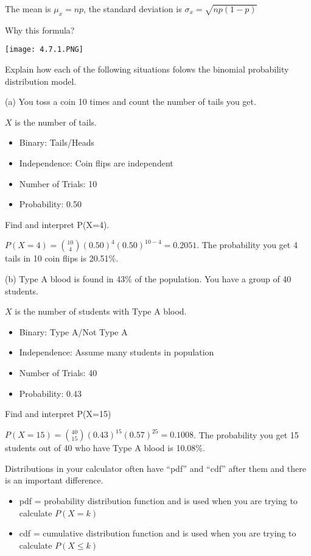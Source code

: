 \documentclass[../stats.tex]{subfiles}
\begin{document}
The mean is $\mu_x=np$, the standard deviation is $\sigma_x=\sqrt{np(1-p)}$

Why this formula?
\begin{center}
    \texttt{[image: 4.7.1.PNG]}
\end{center}

\begin{example}
    Explain how each of the following situations folows the binomial probability distribution model.

    (a) You toss a coin 10 times and count the number of tails you get.

    $X$ is the number of tails.
    \begin{itemize}
        \item Binary: Tails/Heads 
        \item Independence: Coin flips are independent
        \item Number of Trials: 10
        \item Probability: 0.50
    \end{itemize}

    Find and interpret P(X=4).

    $P(X=4)=\binom{10}{4}(0.50)^4(0.50)^{10-4}=0.2051$. The probability you get 4 tails in 10 coin flips is 20.51\%.

    (b) Type A blood is found in 43\% of the population. You have a group of 40 students.

    $X$ is the number of students with Type A blood.
    \begin{itemize}
        \item Binary: Type A/Not Type A 
        \item Independence: Assume many students in population 
        \item Number of Trials: 40
        \item Probability: 0.43
    \end{itemize}

    Find and interpret P(X=15)

    $P(X=15)=\binom{40}{15}(0.43)^{15}(0.57)^{25}=0.1008$. The probability you get 15 students out of 40 who have Type A blood is 10.08\%.
\end{example}

Distributions in your calculator often have ``pdf'' and ``cdf'' after them and there is an important difference.
\begin{itemize}
    \item pdf = probability distribution function and is used when you are trying to calculate $P(X=k)$
    \item cdf = cumulative distribution function and is used when you are trying to calculate $P(X\leq k)$
\end{itemize}
\end{document}
